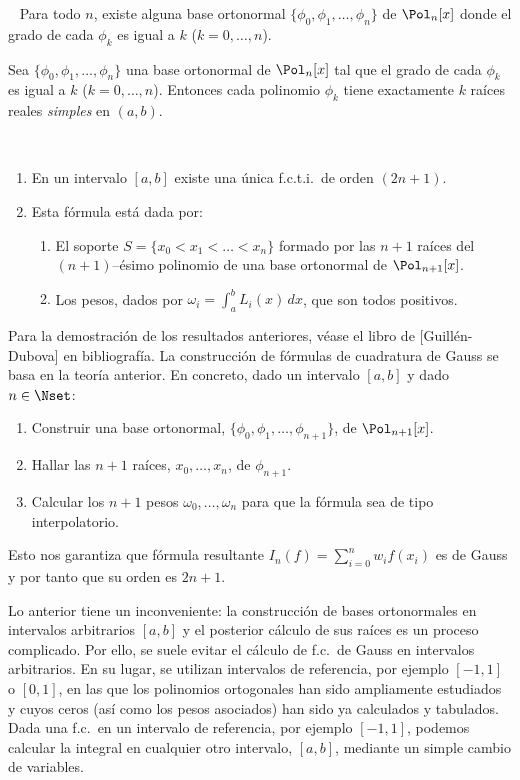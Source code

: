 \begin{proposition}~ Para todo $n$, existe alguna base ortonormal
  $\{\phi_0,\phi_1,\dots,\phi_n\}$ de $\Pol_n[x]$ donde el grado de
  cada $\phi_k$ es igual a $k$ ($k=0,\dots,n$).
\end{proposition}

\begin{proposition}
  Sea $\{\phi_0,\phi_1,\dots,\phi_n\}$ una base ortonormal de
  $\Pol_n[x]$ tal que el grado de cada $\phi_k$ es igual a $k$
  ($k=0,\dots,n$).  Entonces cada polinomio $\phi_k$ tiene exactamente
  $k$ raíces reales \emph{simples} en $(a,b)$.
\end{proposition}

\begin{theorem}~
  \begin{enumerate}
  \item En un intervalo $[a,b]$ existe una única f.c.t.i.\ de orden $(2n+1)$.
  \item Esta fórmula está dada por:
    \begin{enumerate}
    \item El soporte $S=\{x_0<x_1<\dots<x_n\}$ formado por las $n+1$
      raíces del $(n+1)$--ésimo polinomio de una base
      ortonormal de $\Pol_{n+1}[x]$.
    \item Los pesos, dados por $\omega_i=\int_a^b L_i(x)\, dx$, que son
      todos positivos.
    \end{enumerate}
  \end{enumerate}
\end{theorem}

Para la demostración de los resultados anteriores, véase el libro de
[Guillén-Dubova] en bibliografía.
La construcción de fórmulas de cuadratura de Gauss se basa en la
teoría anterior. En concreto, dado un intervalo $[a,b]$ y dado $n\in\Nset$:
\begin{enumerate}
\item Construir una base ortonormal,
  $\{\phi_0,\phi_1,\dots,\phi_{n+1}\}$, de $\Pol_{n+1}[x]$.
\item Hallar las $n+1$ raíces, $x_0,\dots,x_n$, de $\phi_{n+1}$.
\item Calcular los $n+1$ pesos $\omega_0,\dots,\omega_n$ para que la
  fórmula sea de tipo interpolatorio.
\end{enumerate}
Esto nos garantiza que fórmula resultante
$I_n(f)=\sum_{i=0}^n w_i f(x_i)$ es de Gauss y por tanto que su orden
es $2n+1$.

Lo anterior tiene un inconveniente: la construcción de bases
ortonormales en intervalos arbitrarios $[a,b]$ y el posterior cálculo
de sus raíces es un proceso complicado. Por ello, se suele evitar el
cálculo de f.c.\ de Gauss en intervalos arbitrarios. En su lugar, se
utilizan intervalos de referencia, por ejemplo $[-1,1]$ o $[0,1]$, en
las que los polinomios ortogonales han sido ampliamente estudiados y
cuyos ceros (así como los pesos asociados) han sido ya calculados y
tabulados. Dada una f.c.\ en un intervalo de referencia, por ejemplo
$[-1,1]$, podemos calcular la integral en cualquier otro intervalo,
$[a,b]$, mediante un simple cambio de variables.

